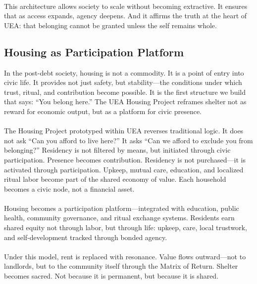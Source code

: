 \documentclass[12pt]{article}
\begin{document}
\paragraph{}This architecture allows society to scale without becoming extractive. It ensures that as access expands, agency deepens. And it affirms the truth at the heart of UEA: that belonging cannot be granted unless the self remains whole. \cite{ahmed2004cultural}

\subsection{Housing as Participation Platform}

In the post-debt society, housing is not a commodity. It is a point of entry into civic life. It provides not just safety, but stability—the conditions under which trust, ritual, and contribution become possible. It is the first structure we build that says: ``You belong here.'' The UEA Housing Project reframes shelter not as reward for economic output, but as a platform for civic presence.

\paragraph{}The Housing Project prototyped within UEA reverses traditional logic. It does not ask ``Can you afford to live here?'' It asks ``Can we afford to exclude you from belonging?'' Residency is not filtered by means, but initiated through civic participation. Presence becomes contribution. Residency is not purchased—it is activated through participation. Upkeep, mutual care, education, and localized ritual labor become part of the shared economy of value. Each household becomes a civic node, not a financial asset. \cite{brown2022architecture}

\paragraph{}Housing becomes a participation platform—integrated with education, public health, community governance, and ritual exchange systems. Residents earn shared equity not through labor, but through life: upkeep, care, local trustwork, and self-development tracked through bonded agency. \cite{lubell2015governing}

\paragraph{}Under this model, rent is replaced with resonance. Value flows outward—not to landlords, but to the community itself through the Matrix of Return. Shelter becomes sacred. Not because it is permanent, but because it is shared.
\end{document}
